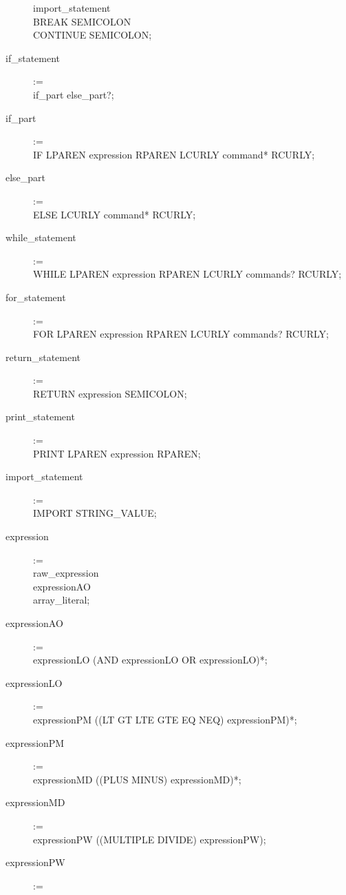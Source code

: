\begin{description}
        import\_statement \textbar \\
        BREAK SEMICOLON \textbar \\
        CONTINUE SEMICOLON;
    \item[if\_statement] := \hfill \\
        if\_part else\_part?;
    \item[if\_part] := \hfill \\
        IF LPAREN expression RPAREN LCURLY command* RCURLY;
    \item[else\_part] := \hfill \\
        ELSE LCURLY command* RCURLY;
    \item[while\_statement] := \hfill \\
        WHILE LPAREN expression RPAREN LCURLY commands? RCURLY;
    \item[for\_statement] := \hfill \\
        FOR LPAREN expression RPAREN LCURLY commands? RCURLY;
    \item[return\_statement] := \hfill \\
        RETURN expression SEMICOLON;
    \item[print\_statement] := \hfill \\
        PRINT LPAREN expression RPAREN; 
    \item[import\_statement] := \hfill \\
        IMPORT STRING\_VALUE; 
    \item[expression] := \hfill \\
        raw\_expression \textbar \\
        expressionAO \textbar \\
        array\_literal;
    \item[expressionAO] := \hfill \\
        expressionLO (AND expressionLO \textbar OR expressionLO)*;
    \item[expressionLO] := \hfill \\
        expressionPM ((LT \textbar GT \textbar LTE \textbar GTE \textbar EQ \textbar NEQ) expressionPM)*;
    \item[expressionPM] := \hfill \\
        expressionMD ((PLUS \textbar MINUS) expressionMD)*;
    \item[expressionMD] := \hfill \\
        expressionPW ((MULTIPLE \textbar DIVIDE) expressionPW);
    \item[expressionPW] := \hfill \\

\end{description}
